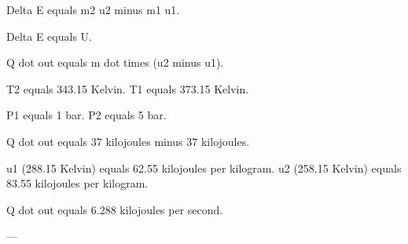 Delta E equals m2 u2 minus m1 u1.  

Delta E equals U.  

Q dot out equals m dot times (u2 minus u1).  

T2 equals 343.15 Kelvin.  
T1 equals 373.15 Kelvin.  

P1 equals 1 bar.  
P2 equals 5 bar.  

Q dot out equals 37 kilojoules minus 37 kilojoules.  

u1 (288.15 Kelvin) equals 62.55 kilojoules per kilogram.  
u2 (258.15 Kelvin) equals 83.55 kilojoules per kilogram.  

Q dot out equals 6.288 kilojoules per second.  

---